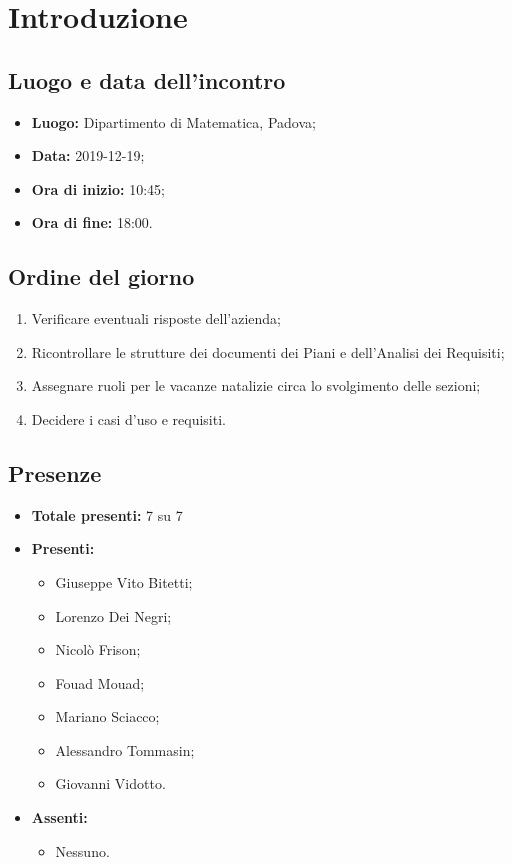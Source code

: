 \section*{Introduzione}

\subsection*{Luogo e data dell'incontro}
	\begin{itemize}
		\item \textbf{Luogo:} Dipartimento di Matematica, Padova;
		\item \textbf{Data:} 2019-12-19;
		\item \textbf{Ora di inizio:} 10:45;
		\item \textbf{Ora di fine:} 18:00.
	\end{itemize}

\subsection*{Ordine del giorno}
	\begin{enumerate}
		\item Verificare eventuali risposte dell'azienda;
		\item  Ricontrollare le strutture dei documenti dei Piani e dell'Analisi dei Requisiti;
		\item  Assegnare ruoli per le vacanze natalizie circa lo svolgimento delle sezioni;
		\item  Decidere i casi d'uso e requisiti.
	\end{enumerate}

\subsection*{Presenze}
	\begin{itemize}
		\item \textbf{Totale presenti:} 7 su 7
		\item \textbf{Presenti: }
			\begin{itemize}			
				\item Giuseppe Vito Bitetti;
				\item Lorenzo Dei Negri;
				\item Nicolò Frison;
				\item Fouad Mouad;
				\item Mariano Sciacco;
				\item Alessandro Tommasin;
				\item Giovanni Vidotto.
			\end{itemize}
		\item \textbf{Assenti: } 
			\begin{itemize}	
				\item Nessuno.
			\end{itemize}
	\end{itemize}


